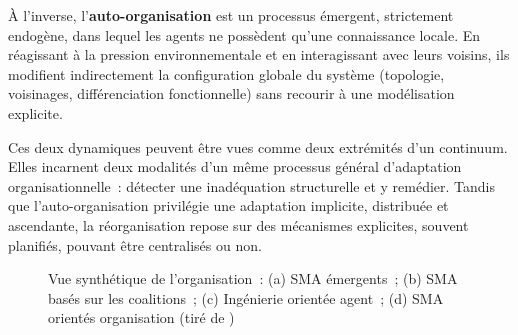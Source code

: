 À l'inverse, l'\textbf{auto-organisation} est un processus émergent, strictement endogène, dans lequel les agents ne possèdent qu'une connaissance locale. En réagissant à la pression environnementale et en interagissant avec leurs voisins, ils modifient indirectement la configuration globale du système (topologie, voisinages, différenciation fonctionnelle) sans recourir à une modélisation explicite.

Ces deux dynamiques peuvent être vues comme deux extrémités d'un continuum. Elles incarnent deux modalités d'un même processus général d'adaptation organisationnelle~: détecter une inadéquation structurelle et y remédier. Tandis que l'auto-organisation privilégie une adaptation implicite, distribuée et ascendante, la réorganisation repose sur des mécanismes explicites, souvent planifiés, pouvant être centralisés ou non.

\begin{figure}[h]
    \centering
    \resizebox{\textwidth}{!}{%
        
    }
    \caption{Vue synthétique de l'organisation~: (a) SMA émergents~; (b) SMA basés sur les coalitions~; (c) Ingénierie orientée agent~; (d) SMA orientés organisation (tiré de \cite{Picard2009reorganisation})}
    \label{fig:auto_vs_topdown}
\end{figure}





